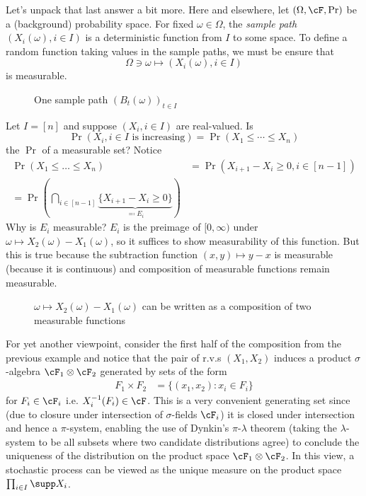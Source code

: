 Let's unpack that last answer a bit more.
Here and elsewhere, let $(\Omega, \cF, \Pr)$ be a (background) probability space.
For fixed $\omega \in \Omega$, the \emph{sample path}
$(X_i(\omega), i \in I)$ is a deterministic function
from $I$ to some space. To define a random function
taking values in the sample paths, we must be ensure that
\[
  \Omega \ni \omega \mapsto (X_i(\omega), i \in I)
\]
is measurable.

\begin{figure}[ht]
  \centering
  \caption{One sample path $(B_t(\omega))_{t \in I}$}
  \label{fig:1-21-1}
\end{figure}

\begin{example}
  Let $I = [n]$ and suppose $(X_i, i \in I)$ are real-valued.
  Is
  \[
    \Pr(X_i, i \in I \text{ is increasing}) = \Pr(X_1 \leq \cdots \leq X_n)
  \]
  the $\Pr$ of a measurable set?
  Notice
  \begin{align*}
    \Pr(X_1 \leq \ldots \leq X_n)
    &= \Pr(X_{i+1} - X_i \geq 0, i \in [n-1]) \\
    = \Pr\left(
      \bigcap_{i \in [n-1]}
      \underbrace{\{X_{i+1} - X_i \geq 0\}}_{\eqqcolon E_i}
    \right)
  \end{align*}
  Why is $E_i$ measurable?
  $E_i$ is the preimage of $[0, \infty)$ under
  $\omega \mapsto X_2(\omega) - X_1(\omega)$,
  so it suffices to show measurability of this function.
  But this is true because the subtraction function $(x,y) \mapsto y - x$ is
  measurable (because it is continuous) and composition of measurable functions
  remain measurable.

  \begin{figure}[H]
    \centering
    \caption{
      $\omega \mapsto X_2(\omega) - X_1(\omega)$
      can be written as a composition of two measurable functions
    }
    \label{fig:1-21-2}
  \end{figure}
\end{example}

For yet another viewpoint, consider the first half of the composition from the
previous example and notice that the pair of r.v.s $(X_1, X_2)$ induces a
product $\sigma$-algebra $\cF_1 \otimes \cF_2$ generated by sets of the form
\begin{align}
  F_1 \times F_2
    &= \{(x_1, x_2) : x_i \in F_i \}
\end{align}
for $F_i \in \cF_i$ i.e. $X_i^{-1}(F_i) \in \cF$.
This is a very convenient generating set since (due to closure under
intersection of $\sigma$-fields $\cF_i$) it is closed under intersection and
hence a $\pi$-system, enabling the use of Dynkin's $\pi$-$\lambda$ theorem
(taking the $\lambda$-system to be all subsets where two candidate
distributions agree) to conclude the uniqueness of the distribution on the
product space $\cF_1 \otimes \cF_2$. In this view, a stochastic process
can be viewed as the unique measure on the product space
$\prod_{i \in I} \supp X_i$.

